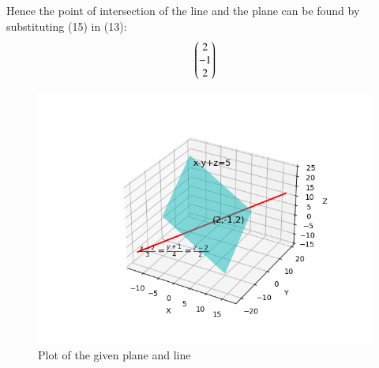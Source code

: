 \documentclass[journal]{IEEEtran}
\begin{document}
Hence the point of intersection of the line and the plane can be found by substituting (15) in (13):
\begin{align}
    \begin{pmatrix}2\\-1\\2\end{pmatrix}
\end{align}

\begin{figure}[h!]
   \centering
   \includegraphics[width=0.7\linewidth]{figs/plot.png}
   \caption{Plot of the given plane and line}
   \label{}
\end{figure}
\end{document}
